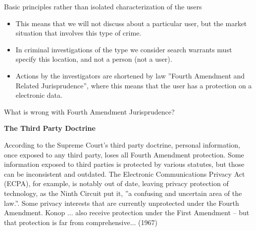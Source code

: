 \documentclass[notes]{beamer}
\begin{document}
\begin{frame}
\begin{block}{Basic principles rather than isolated characterization of the users}

\begin{itemize}

\item[\checkmark]This means that we will not discuss about a particular user, but the market situation that involves this type of crime.

\item[\checkmark]In criminal investigations of the type we consider search warrants must specify this location, and not a person (not a user).

\item[\checkmark]Actions by the investigators are shortened by law ''Fourth Amendment and Related Jurisprudence'', where this means that the user has a protection on a electronic data.

\end{itemize}

\end{block}

\end{frame}

\begin{frame}
\begin{block}{What is wrong with Fourth Amendment Jurisprudence?}

\textbf{The Third Party Doctrine}
 
According to the Supreme Court's third party doctrine, personal information, once exposed to any third party, loses all Fourth Amendment protection. Some information exposed to third parties is protected by various statutes, but those can be inconsistent and outdated. The Electronic Communications Privacy Act (ECPA), for example, is notably out of date, leaving privacy protection of technology, as the Ninth Circuit put it, ''a confusing and uncertain area of the law.''. Some privacy interests that are currently unprotected under the Fourth Amendment. Konop ... also receive protection under the First Amendment – but that protection is far from comprehensive... (1967)

\end{block}

\end{frame}
\end{document}
